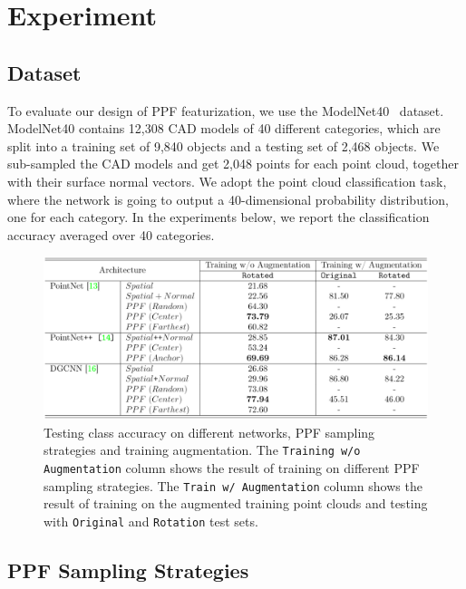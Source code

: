 \documentclass{article}
\begin{document}
\section{Experiment}

\subsection{Dataset}

To evaluate our design of PPF featurization, we use the ModelNet40~\cite{Wu2015-3dshapenet} dataset. ModelNet40 contains 12,308 CAD models of 40 different categories, which are split into a training set of 9,840 objects and a testing set of 2,468 objects. We sub-sampled the CAD models and get 2,048 points for each point cloud, together with their surface normal vectors. We adopt the point cloud classification task, where the network is going to output a 40-dimensional probability distribution, one for each category. In the experiments below, we report the classification accuracy averaged over 40 categories. 

\begin{figure}[hbt!]
\centering
    \includegraphics[width=.9\linewidth]{images/table.png}
    \caption{Testing class accuracy on different networks, PPF sampling strategies and training augmentation. The \texttt{Training w/o Augmentation} column shows the result of training on different PPF sampling strategies. The \texttt{Train w/ Augmentation} column shows the result of training on the augmented training point clouds and testing with \texttt{Original} and \texttt{Rotation} test sets.}
\label{fig:table}
\end{figure}

\subsection{PPF Sampling Strategies}
\end{document}
